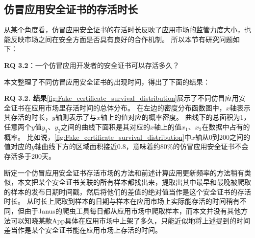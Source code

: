 \subsection{仿冒应用安全证书的存活时长}
从某个角度看，仿冒应用安全证书的存活时长反映了应用市场的监管力度大小，也能反映市场之间在安全方面是否具有良好的合作机制。
所以本节有研究问题如下：

{\bf RQ 3.2}：一个仿冒应用开发者的安全证书可以存活多久？

本文整理了不同仿冒应用安全证书的出现时间，得出了下面的结果：

{\bf RQ 3.2. 结果}\autoref{fig:Fake_certificate_survival_distribution}展示了不同仿冒应用安全证书在应用市场里存活时间的总体分布。
在左边的密度分布函数图中，$x$轴表示其存活的时长，$y$轴则表示了与$x$轴上的值对应的概率密度。
曲线下的总面积为1，任意两个$y$值$y_1$、$y_2$之间的曲线下面积是其对应的$x$轴上的值$x_1$、$x_2$在数据中占有的概率。
比如说，\autoref{fig:Fake_certificate_survival_distribution}中$x$轴从0到200之间的值对应的$y$轴曲线下方的区域面积接近0.8，意味着约80\%的仿冒应用安全证书不会存活多于200天。

断定一个仿冒应用安全证书存活市场的方法和前述计算应用更新频率的方法稍有类似，本文把某个安全证书关联的所有样本都找出来，提取出其中最早和最晚被爬取的样本的发布日期时间戳，然后将他们的差值的绝对值当作是这个安全证书的存活时长。
从时长上爬取到样本的日期与样本在应用市场上实际能存活的时间稍有不同，但由于Janus的爬虫工具每日都从应用市场中爬取样本，而本文并没有其他方法可以知晓某款App具体在应用市场中上架了多久，只能近似地将上述提到的时间差当作是某个安全证书能在应用市场上存活的时间。

